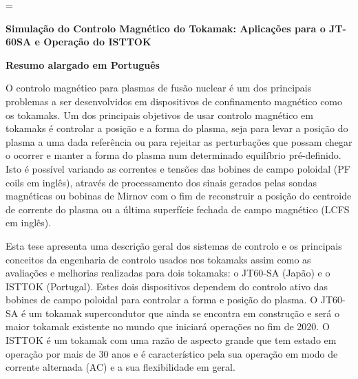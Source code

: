 





\usepackage{enumitem}
\usepackage{notoccite}
\usepackage{longtable}
\usepackage{multirow}
\usepackage{lipsum}
\usepackage{xcolor,colortbl}
\usepackage{mathtools}

\DeclareMathOperator*{\argmin}{arg\,min}
\DeclareMathOperator{\dist}{\mathit{dist}}


	\emergencystretch=\maxdimen
	
	{\fontsize{12}{12}\selectfont \textbf{ Simulação do Controlo Magnético do Tokamak: Aplicações para o JT-60SA e Operação do ISTTOK}}
	
\medskip

\setlength{\parskip}{1em}

	
	\textbf{Resumo alargado em Português}
	\smallskip
	
O controlo magnético para  plasmas de fusão nuclear é um dos principais problemas a ser desenvolvidos em dispositivos de confinamento magnético como os tokamaks. Um dos principais objetivos de usar controlo magnético em tokamaks é controlar a posição e a forma do plasma, seja para levar a posição do plasma a uma dada referência ou para rejeitar as perturbações que possam chegar o ocorrer e manter a forma do plasma num determinado equilíbrio pré-definido. Isto é possível variando as correntes e tensões das bobines de campo poloidal  (PF coils em inglês), através de processamento dos sinais gerados pelas sondas magnéticas ou bobinas de Mirnov com o fim de reconstruir a posição do centroide de corrente do plasma ou a última superfície fechada de campo magnético (LCFS em inglês).\smallskip

Esta tese apresenta  uma descrição geral dos sistemas de controlo e os principais conceitos da engenharia de controlo usados nos tokamaks assim como as avaliações e melhorias realizadas para dois tokamaks: o JT60-SA (Japão) e o ISTTOK (Portugal). Estes dois dispositivos dependem do controlo ativo das bobines de campo poloidal para controlar a forma e posição do plasma. O JT60-SA é um tokamak supercondutor que ainda se encontra em construção e será o maior tokamak existente no mundo que iniciará operações no fim de 2020. O ISTTOK é um tokamak com uma razão de aspecto grande que tem estado em operação por mais de 30 anos e é característico pela sua operação em modo de corrente alternada (AC) e a sua flexibilidade em geral.\smallskip

